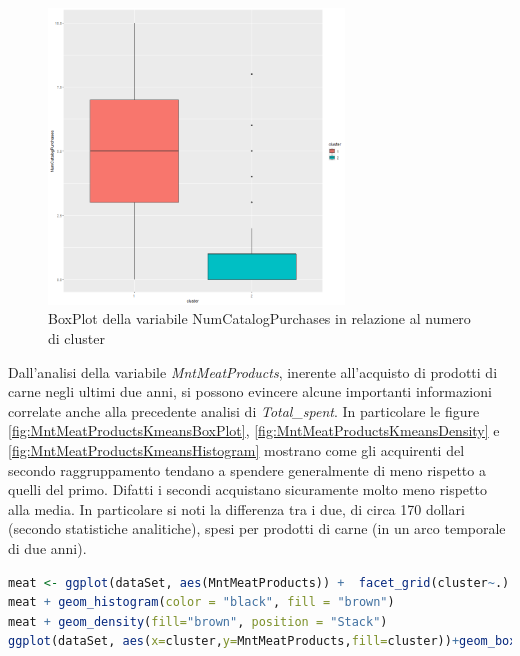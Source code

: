 \documentclass[letterpaper,11pt]{article}
\begin{document}
\begin{figure}[H]
    \centering
    \includegraphics[width=0.7\textwidth]{Img/K-MEANS/KMEANS018.png}
    \caption{BoxPlot della variabile NumCatalogPurchases in relazione al numero di cluster}
    \label{fig:NumCatalogPurchasesKmeansBoxPlot}
\end{figure}

Dall'analisi della variabile \textit{MntMeatProducts}, inerente all'acquisto di prodotti di carne negli ultimi due anni, si possono evincere alcune importanti informazioni correlate anche alla precedente analisi di \textit{Total\_spent}. In particolare le figure \ref{fig:MntMeatProductsKmeansBoxPlot}, \ref{fig:MntMeatProductsKmeansDensity} e \ref{fig:MntMeatProductsKmeansHistogram} mostrano come gli acquirenti del secondo raggruppamento tendano a spendere generalmente di meno rispetto a quelli del primo. Difatti i secondi acquistano sicuramente molto meno rispetto alla media. In particolare si noti la differenza tra i due, di circa 170 dollari (secondo statistiche analitiche), spesi per prodotti di carne (in un arco temporale di due anni).

\begin{lstlisting}[language=R]
meat <- ggplot(dataSet, aes(MntMeatProducts)) +  facet_grid(cluster~.)
meat + geom_histogram(color = "black", fill = "brown") 
meat + geom_density(fill="brown", position = "Stack")
ggplot(dataSet, aes(x=cluster,y=MntMeatProducts,fill=cluster))+geom_boxplot(outlier.colour="black")
\end{lstlisting}
\end{document}
